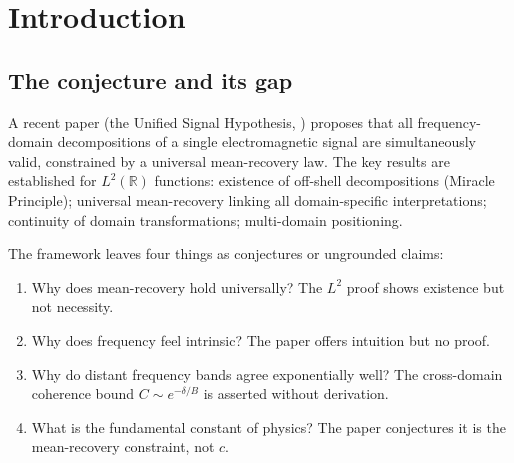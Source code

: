 \documentclass[twocolumn,10pt,a4paper]{article}
\theoremstyle{thmstyle}
\theoremstyle{definition}
\theoremstyle{remark}
\newcommand{\R}{\mathbb{R}}
\begin{document}
\begin{abstract}
We trace the mean-recovery constraint through five physical domains
(MS fragmentation, LHC collisions, molecular spectral holography,
atomic spectroscopy, and single-beam positioning) and show that in each
case the ``constraint'' is not an imposed law but the direct consequence
of bounded phase space.

\medskip
\noindent\textbf{Keywords:} mean-recovery; unified signal hypothesis;
bounded phase space; frequency as derived quantity; cross-domain coherence;
virtual substates; partition algebra; five synonyms; spectral hologram;
signal unification
\end{abstract}

\tableofcontents

\section{Introduction}
\label{sec:intro}

\subsection{The conjecture and its gap}

A recent paper (the Unified Signal Hypothesis, \citealt{companion:signal_source})
proposes that all frequency-domain decompositions of a single electromagnetic
signal are simultaneously valid, constrained by a universal mean-recovery
law.  The key results are established for $L^2(\R)$ functions:
existence of off-shell decompositions (Miracle Principle); universal
mean-recovery linking all domain-specific interpretations; continuity of
domain transformations; multi-domain positioning.

The framework leaves four things as conjectures or ungrounded claims:
\begin{enumerate}[nosep]
\item Why does mean-recovery hold universally?  The $L^2$ proof shows
  existence but not necessity.
\item Why does frequency feel intrinsic?  The paper offers intuition but
  no proof.
\item Why do distant frequency bands agree exponentially well?  The
  cross-domain coherence bound $C \sim e^{-\delta/B}$ is asserted without
  derivation.
\item What is the fundamental constant of physics?  The paper conjectures
  it is the mean-recovery constraint, not $c$.
\end{enumerate}
\end{document}
